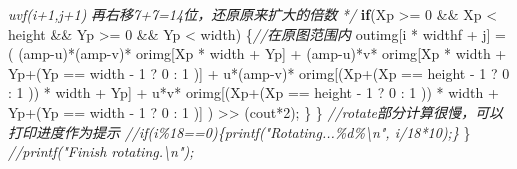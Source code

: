 \documentclass[
]{article}
\newenvironment{Shaded}{}{}
\newcommand{\CommentTok}[1]{\textcolor[rgb]{0.38,0.63,0.69}{\textit{#1}}}
\newcommand{\ControlFlowTok}[1]{\textcolor[rgb]{0.00,0.44,0.13}{\textbf{#1}}}
\newcommand{\DecValTok}[1]{\textcolor[rgb]{0.25,0.63,0.44}{#1}}
\newcommand{\NormalTok}[1]{#1}
\newcommand{\OperatorTok}[1]{\textcolor[rgb]{0.40,0.40,0.40}{#1}}
\begin{document}
\begin{Shaded}
\begin{Highlighting}[]
\CommentTok{            uvf(i+1,j+1)}
\CommentTok{            再右移7+7=14位，还原原来扩大的倍数}
\CommentTok{             */}
            \ControlFlowTok{if}\OperatorTok{(}\NormalTok{Xp }\OperatorTok{\textgreater{}=} \DecValTok{0} \OperatorTok{\&\&}\NormalTok{ Xp }\OperatorTok{\textless{}}\NormalTok{ height }\OperatorTok{\&\&}\NormalTok{ Yp }\OperatorTok{\textgreater{}=} \DecValTok{0} \OperatorTok{\&\&}\NormalTok{ Yp }\OperatorTok{\textless{}}\NormalTok{ width}\OperatorTok{)} \OperatorTok{\{}\CommentTok{//在原图范围内}
\NormalTok{              outimg}\OperatorTok{[}\NormalTok{i }\OperatorTok{*}\NormalTok{ widthf }\OperatorTok{+}\NormalTok{ j}\OperatorTok{]} \OperatorTok{=} \OperatorTok{(} \OperatorTok{(}\NormalTok{amp}\OperatorTok{{-}}\NormalTok{u}\OperatorTok{)*(}\NormalTok{amp}\OperatorTok{{-}}\NormalTok{v}\OperatorTok{)*}\NormalTok{   orimg}\OperatorTok{[}\NormalTok{Xp }\OperatorTok{*}\NormalTok{ width }\OperatorTok{+}\NormalTok{ Yp}\OperatorTok{]} \OperatorTok{+} 
              \OperatorTok{(}\NormalTok{amp}\OperatorTok{{-}}\NormalTok{u}\OperatorTok{)*}\NormalTok{v}\OperatorTok{*}\NormalTok{ orimg}\OperatorTok{[}\NormalTok{Xp }\OperatorTok{*}\NormalTok{ width }\OperatorTok{+}\NormalTok{ Yp}\OperatorTok{+(}\NormalTok{Yp }\OperatorTok{==}\NormalTok{ width }\OperatorTok{{-}} \DecValTok{1} \OperatorTok{?} \DecValTok{0} \OperatorTok{:} \DecValTok{1} \OperatorTok{)]} \OperatorTok{+} 
\NormalTok{              u}\OperatorTok{*(}\NormalTok{amp}\OperatorTok{{-}}\NormalTok{v}\OperatorTok{)*}\NormalTok{ orimg}\OperatorTok{[(}\NormalTok{Xp}\OperatorTok{+(}\NormalTok{Xp }\OperatorTok{==}\NormalTok{ height }\OperatorTok{{-}} \DecValTok{1} \OperatorTok{?} \DecValTok{0} \OperatorTok{:} \DecValTok{1} \OperatorTok{))} \OperatorTok{*}\NormalTok{ width }\OperatorTok{+}\NormalTok{ Yp}\OperatorTok{]} \OperatorTok{+} 
\NormalTok{              u}\OperatorTok{*}\NormalTok{v}\OperatorTok{*}\NormalTok{       orimg}\OperatorTok{[(}\NormalTok{Xp}\OperatorTok{+(}\NormalTok{Xp }\OperatorTok{==}\NormalTok{ height }\OperatorTok{{-}} \DecValTok{1} \OperatorTok{?} \DecValTok{0} \OperatorTok{:} \DecValTok{1} \OperatorTok{))} \OperatorTok{*}\NormalTok{ width }\OperatorTok{+}\NormalTok{ Yp}\OperatorTok{+(}\NormalTok{Yp }\OperatorTok{==} 
\NormalTok{              width }\OperatorTok{{-}} \DecValTok{1} \OperatorTok{?} \DecValTok{0} \OperatorTok{:} \DecValTok{1} \OperatorTok{)]} \OperatorTok{)} \OperatorTok{\textgreater{}\textgreater{}} \OperatorTok{(}\NormalTok{cout}\OperatorTok{*}\DecValTok{2}\OperatorTok{);}
            \OperatorTok{\}}
        \OperatorTok{\}}
        \CommentTok{//rotate部分计算很慢，可以打印进度作为提示}
        \CommentTok{//if(i\%18==0)\{printf("Rotating...\%d\%\textbackslash{}n", i/18*10);\}}
    \OperatorTok{\}}
    \CommentTok{//printf("Finish rotating.\textbackslash{}n");}


\end{Highlighting}
\end{Shaded}
\end{document}
